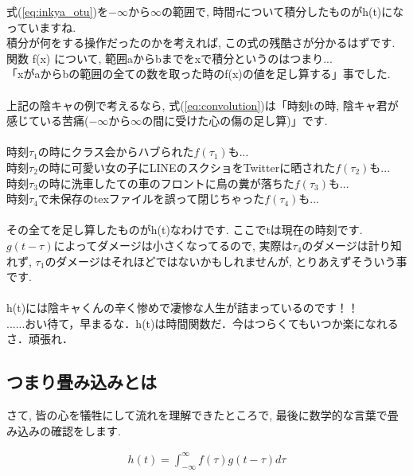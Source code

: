 \documentclass[11pt,a4paper,uplatex]{ujreport}
\begin{document}
式(\ref{eq:inkya_otu})を$-\infty$から$\infty$の範囲で, 時間$\tau$について積分したものがh(t)になっていますね.\\
積分が何をする操作だったのかを考えれば, この式の残酷さが分かるはずです.\\
関数 f(x) について, 範囲aからbまでをxで積分というのはつまり...\\
「xがaからbの範囲の全ての数を取った時のf(x)の値を足し算する」事でした. \\
\\
上記の陰キャの例で考えるなら, 式(\ref{eq:convolution})は「時刻tの時, 陰キャ君が感じている苦痛($-\infty$から$\infty$の間に受けた心の傷の足し算)」です.\\
\\
時刻$\tau_1$の時にクラス会からハブられた$f(\tau_1)$も...\\
時刻$\tau_2$の時に可愛い女の子にLINEのスクショをTwitterに晒された$f(\tau_2)$も...\\
時刻$\tau_3$の時に洗車したての車のフロントに鳥の糞が落ちた$f(\tau_3)$も...\\
時刻$\tau_4$で未保存のtexファイルを誤って閉じちゃった$f(\tau_4)$も...\\
\\
その全てを足し算したものがh(t)なわけです. ここでtは現在の時刻です. \\
$g(t-\tau)$によってダメージは小さくなってるので, 実際は$\tau_4$のダメージは計り知れず, $\tau_1$のダメージはそれほどではないかもしれませんが, とりあえずそういう事です. \\
\\
h(t)には陰キャくんの辛く惨めで凄惨な人生が詰まっているのです！！\\
......おい待て，早まるな．h(t)は時間関数だ．今はつらくてもいつか楽になれるさ．頑張れ．



\subsection{つまり畳み込みとは}
さて, 皆の心を犠牲にして流れを理解できたところで, 最後に数学的な言葉で畳み込みの確認をします.

\begin{eqnarray}
\label{eq:conv}
h(t) = \int^{\infty}_{-\infty} f(\tau) g(t - \tau) d\tau
\end{eqnarray}
\end{document}
